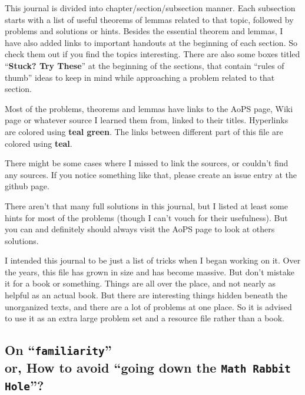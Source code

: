 This journal is divided into chapter/section/subsection manner. Each subsection starts
with a list of useful theorems of lemmas related to that topic, followed by problems and
solutions or hints. Besides the essential theorem and lemmas, I have also added links to
important handouts at the beginning of each section. So check them out if you find the
topics interesting. There are also some boxes titled ``\textbf{Stuck? Try These}'' at the
beginning of the sections, that contain ``rules of thumb'' ideas to keep in mind while
approaching a problem related to that section. 

\thispagestyle{empty}

Most of the problems, theorems and lemmas have links to the AoPS page, Wiki page or
whatever source I learned them from, linked to their titles. Hyperlinks are colored using
\textcolor{urlC}{\textbf{teal green}}. The links between different part of this file are
colored using \textcolor{linkC}{\textbf{teal}}. 

There might be some cases where I missed to link the sources, or couldn't find any
sources. If you notice something like that, please create an issue entry at the github
page.

There aren't that many full solutions in this journal, but I listed at least some hints
for most of the problems (though I can't vouch for their usefulness). But you can and
definitely should always visit the AoPS page to look at others solutions.

\vspace{2em}

I intended this journal to be just a list of tricks when I began working on it. Over the
years, this file has grown in size and has become massive. But don't mistake it for a book
or something. Things are all over the place, and not nearly as helpful as an actual
book. But there are interesting things hidden beneath the unorganized texts, and there are
a lot of problems at one place. So it is advised to use it as an extra large problem set
and a resource file rather than a book.

\vspace{1em}

\flushright{
    \signature\\
    \today
}


\newpage 
\subsection*{On ``\texttt{familiarity}'' \\ or, How to avoid ``going down the
\texttt{Math Rabbit Hole}''?}
\thispagestyle{empty}

